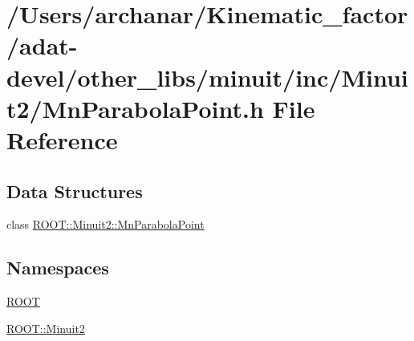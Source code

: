 \hypertarget{adat-devel_2other__libs_2minuit_2inc_2Minuit2_2MnParabolaPoint_8h}{}\section{/\+Users/archanar/\+Kinematic\+\_\+factor/adat-\/devel/other\+\_\+libs/minuit/inc/\+Minuit2/\+Mn\+Parabola\+Point.h File Reference}
\label{adat-devel_2other__libs_2minuit_2inc_2Minuit2_2MnParabolaPoint_8h}
\subsection*{Data Structures}
\begin{DoxyCompactItemize}
\item 
class \mbox{\hyperlink{classROOT_1_1Minuit2_1_1MnParabolaPoint}{R\+O\+O\+T\+::\+Minuit2\+::\+Mn\+Parabola\+Point}}
\end{DoxyCompactItemize}
\subsection*{Namespaces}
\begin{DoxyCompactItemize}
\item 
 \mbox{\hyperlink{namespaceROOT}{R\+O\+OT}}
\item 
 \mbox{\hyperlink{namespaceROOT_1_1Minuit2}{R\+O\+O\+T\+::\+Minuit2}}
\end{DoxyCompactItemize}
